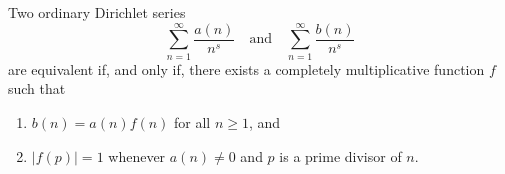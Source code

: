 Two ordinary Dirichlet series
$$\sum_{n=1}^{\infty} \frac{a(n)}{n^s} \quad \text{and} \quad \sum_{n=1}^{\infty} \frac{b(n)}{n^s}$$
are equivalent if, and only if, there exists a completely multiplicative function $f$ such that

\begin{enumerate}
\item[(a)] $b(n) = a(n)f(n)$ for all $n \geq 1$, and
\item[(b)] $|f(p)| = 1$ whenever $a(n) \neq 0$ and $p$ is a prime divisor of $n$.
\end{enumerate}
